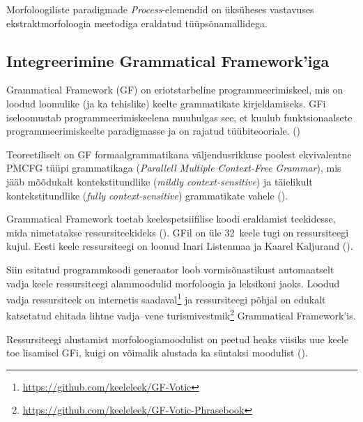 \documentclass[12pt,a4paper]{article}
\begin{document}
Morfoloogiliste paradigmade \textit{Process}-elemendid on üks\-üheses vastavuses ekstrakt\-morfoloogia meetodiga eraldatud tüüpsõna\-mallidega.




\FloatBarrier
\subsection{Integreerimine Grammatical Framework'iga}
\label{sec:gf}

Grammatical Framework (GF) on eriotstarbeline programmeerimis\-keel, mis on loodud loomulike (ja ka tehislike) keelte grammatikate kirjeldamiseks. GFi iseloomustab programmeerimis\-keelena muuhulgas see, et kuulub funktsionaalsete programmeerimis\-keelte paradigmasse ja on rajatud tüübiteooriale. (\cite[\RN{7}]{ranta_grammatical_2011}) %

Teoreetiliselt on GF formaal\-grammatikana väljendus\-rikkuse poolest ekvivalentne PMCFG tüüpi grammatikaga (\textit{Parallell Multiple Context-Free Grammar}), mis jääb mõõdukalt konteksti\-tundlike (\textit{mildly context-sensitive}) ja täielikult konteksti\-tundlike (\textit{fully context-sensitive}) grammatikate vahele (\cite[10]{ranta_grammatical_2011}).

Grammatical Framework toetab keele\-spetsiifilise koodi eraldamist teekidesse, mida nimetatakse ressursi\-teekideks (\cites{ranta_grammars_2008}[97]{ranta_grammatical_2011}). GFil on üle 32~keele tugi on ressursi\-teegi kujul. Eesti keele ressursi\-teegi on loonud Inari Listenmaa ja Kaarel Kaljurand (\citeyear{listenmaa_computational_2014}). %

Siin esitatud programm\-koodi generaator loob vormisõnastikust automaatselt vadja keele ressursi\-teegi alam\-moodulid morfoloogia ja leksikoni jaoks. Loodud vadja ressursi\-teek on internetis saadaval\footnote{\url{https://github.com/keeleleek/GF-Votic}} ja ressursi\-teegi põhjal on edukalt katsetatud ehitada lihtne vadja--vene turismi\-vestmik\footnote{\url{https://github.com/keeleleek/GF-Votic-Phrasebook}} Grammatical Framework'is.

Ressursi\-teegi alustamist morfoloogia\-moodulist on peetud heaks viisiks uue keele toe lisamisel GFi, kuigi on võimalik alustada ka süntaksi moodulist (\cite[209]{ranta_grammatical_2011}). %
\end{document}

